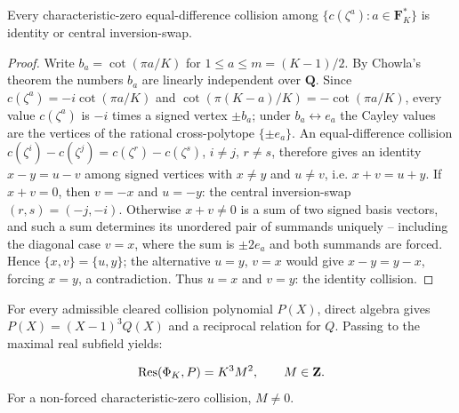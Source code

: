 \begin{theorem}\label{thm:add-rigidity}
Every characteristic-zero equal-difference collision among
$\{c(\zeta^a):a\in\mathbf F_K^*\}$ is identity or central inversion-swap.
\end{theorem}

\begin{proof}
Write $b_a=\cot(\pi a/K)$ for $1\le a\le m=(K-1)/2$.  By Chowla's theorem
\cite{Chowla1970,Wang1982} the numbers $b_a$ are linearly independent over
$\mathbf Q$.  Since $c(\zeta^a)=-i\cot(\pi a/K)$ and
$\cot(\pi(K-a)/K)=-\cot(\pi a/K)$, every value $c(\zeta^a)$ is $-i$ times a
signed vertex $\pm b_a$; under $b_a\leftrightarrow e_a$ the Cayley values are
the vertices of the rational cross-polytope $\{\pm e_a\}$.  An
equal-difference collision $c(\zeta^i)-c(\zeta^j)=c(\zeta^r)-c(\zeta^s)$,
$i\ne j$, $r\ne s$, therefore gives an identity $x-y=u-v$ among signed
vertices with $x\ne y$ and $u\ne v$, i.e. $x+v=u+y$.  If $x+v=0$, then
$v=-x$ and $u=-y$: the central inversion-swap $(r,s)=(-j,-i)$.  Otherwise
$x+v\ne0$ is a sum of two signed basis vectors, and such a sum determines
its unordered pair of summands uniquely -- including the diagonal case
$v=x$, where the sum is $\pm2e_a$ and both summands are forced.  Hence
$\{x,v\}=\{u,y\}$; the alternative $u=y$, $v=x$ would give $x-y=y-x$,
forcing $x=y$, a contradiction.  Thus $u=x$ and $v=y$: the identity
collision.
\end{proof}

For every admissible cleared collision polynomial $P(X)$, direct algebra gives
$P(X)=(X-1)^3Q(X)$ and a reciprocal relation for $Q$.  Passing to the maximal
real subfield yields:

\begin{theorem}\label{thm:square-res}
\begin{equation}\label{eq:square-res}
\operatorname{Res}(\Phi_K,P)=K^3M^2,\qquad M\in\mathbf Z.
\end{equation}
For a non-forced characteristic-zero collision, $M\ne0$.
\end{theorem}

